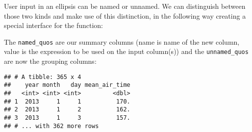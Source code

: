 \documentclass[]{book}
\newenvironment{Shaded}{\begin{snugshade}}{\end{snugshade}}
\newcommand{\CommentTok}[1]{\textcolor[rgb]{0.56,0.35,0.01}{\textit{#1}}}
\newcommand{\ControlFlowTok}[1]{\textcolor[rgb]{0.13,0.29,0.53}{\textbf{#1}}}
\newcommand{\DataTypeTok}[1]{\textcolor[rgb]{0.13,0.29,0.53}{#1}}
\newcommand{\KeywordTok}[1]{\textcolor[rgb]{0.13,0.29,0.53}{\textbf{#1}}}
\newcommand{\NormalTok}[1]{#1}
\newcommand{\OperatorTok}[1]{\textcolor[rgb]{0.81,0.36,0.00}{\textbf{#1}}}
\newcommand{\OtherTok}[1]{\textcolor[rgb]{0.56,0.35,0.01}{#1}}
\newcommand{\StringTok}[1]{\textcolor[rgb]{0.31,0.60,0.02}{#1}}
\begin{document}
User input in an ellipsis can be named or unnamed.
We can distinguish between those two kinds and make use of this distinction, in the following way creating a special interface for the function:

\begin{Shaded}
\end{Shaded}

The \texttt{named\_quos} are our summary columns (name is name of the new column, value is the expression to be used on the input column(s)) and the \texttt{unnamed\_quos} are now the grouping columns:

\begin{Shaded}
\end{Shaded}

\begin{verbatim}
## # A tibble: 365 x 4
##    year month   day mean_air_time
##   <int> <int> <int>         <dbl>
## 1  2013     1     1          170.
## 2  2013     1     2          162.
## 3  2013     1     3          157.
## # ... with 362 more rows
\end{verbatim}
\end{document}
